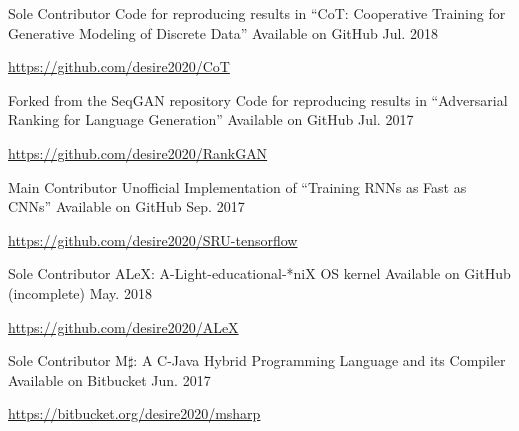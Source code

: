 

\begin{cventries}

  \cventry
    {Sole Contributor} %
    {Code for reproducing results in ``CoT: Cooperative Training for Generative Modeling of Discrete
Data''} %
    {Available on GitHub} %
    {Jul. 2018} %
    {
      \begin{cvitems} %
        \item {\url{https://github.com/desire2020/CoT}}
      \end{cvitems}
    }

  \cventry
    {Forked from the SeqGAN repository} %
    {Code for reproducing results in ``Adversarial Ranking for Language Generation''} %
    {Available on GitHub} %
    {Jul. 2017} %
    {
      \begin{cvitems} %
        \item {\url{https://github.com/desire2020/RankGAN}}
      \end{cvitems}
    }

  \cventry
    {Main Contributor} %
    {Unofficial Implementation of ``Training RNNs as Fast as CNNs''} %
    {Available on GitHub} %
    {Sep. 2017} %
    {
      \begin{cvitems} %
        \item {\url{https://github.com/desire2020/SRU-tensorflow}}
      \end{cvitems}
    }

  \cventry
    {Sole Contributor} %
    {ALeX: A-Light-educational-*niX OS kernel} %
    {Available on GitHub (incomplete)} %
    {May. 2018} %
    {
      \begin{cvitems} %
        \item {\url{https://github.com/desire2020/ALeX}}
      \end{cvitems}
    }

  \cventry
    {Sole Contributor} %
    {M$\sharp$: A C-Java Hybrid Programming Language and its Compiler} %
    {Available on Bitbucket} %
    {Jun. 2017} %
    {
      \begin{cvitems} %
        \item {\url{https://bitbucket.org/desire2020/msharp}}
      \end{cvitems}
    }


\end{cventries}
